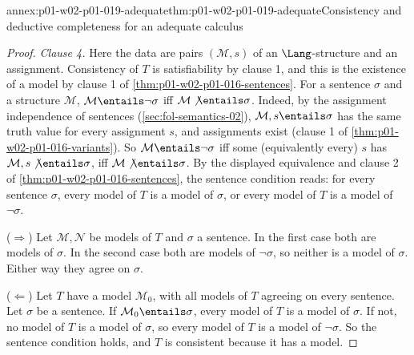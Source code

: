 \begin{annexitem}{annex:p01-w02-p01-019-adequate}{thm:p01-w02-p01-019-adequate}{Consistency and deductive completeness for an adequate calculus}
\begin{proof}
\emph{Clause 4.} Here the data are pairs \((\mathcal M,s)\) of an
\(\Lang\)-structure and an assignment. Consistency of \(T\) is
satisfiability by clause 1, and this is the existence of a model by clause 1
of \cref{thm:p01-w02-p01-016-sentences}. For a sentence \(\sigma\) and a
structure \(\mathcal M\), \(\mathcal M\entails\neg\sigma\) iff
\(\mathcal M\not\entails\sigma\). Indeed, by the assignment independence of
sentences (\cref{sec:fol-semantics-02}), \(\mathcal M,s\entails\sigma\) has
the same truth value for every assignment \(s\), and assignments exist
(clause 1 of \cref{thm:p01-w02-p01-016-variants}). So
\(\mathcal M\entails\neg\sigma\) iff some (equivalently every) \(s\) has
\(\mathcal M,s\not\entails\sigma\), iff \(\mathcal M\not\entails\sigma\). By
the displayed equivalence and clause 2 of
\cref{thm:p01-w02-p01-016-sentences}, the sentence condition reads: for every
sentence \(\sigma\), every model of \(T\) is a model of \(\sigma\), or every
model of \(T\) is a model of \(\neg\sigma\).

(\(\Rightarrow\)) Let \(\mathcal M,\mathcal N\) be models of \(T\) and
\(\sigma\) a sentence. In the first case both are models of \(\sigma\). In
the second case both are models of \(\neg\sigma\), so neither is a model of
\(\sigma\). Either way they agree on \(\sigma\).

(\(\Leftarrow\)) Let \(T\) have a model \(\mathcal M_0\), with all models of
\(T\) agreeing on every sentence. Let \(\sigma\) be a sentence. If
\(\mathcal M_0\entails\sigma\), every model of \(T\) is a model of
\(\sigma\). If not, no model of \(T\) is a model of \(\sigma\), so every model
of \(T\) is a model of \(\neg\sigma\). So the sentence condition holds, and
\(T\) is consistent because it has a model.
\end{proof}
\end{annexitem}

